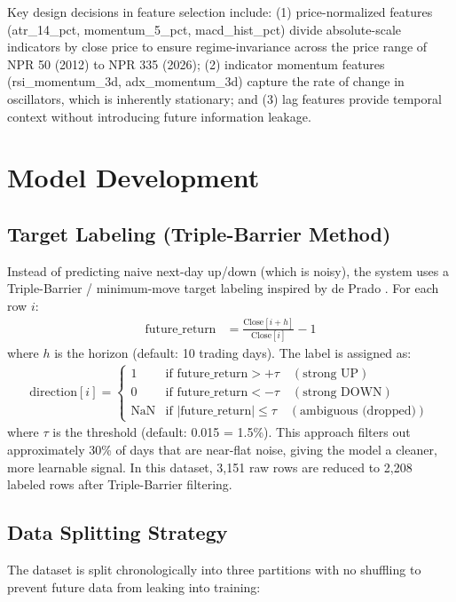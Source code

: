 \documentclass[12pt, a4paper]{report}
\begin{document}
	Key design decisions in feature selection include: (1) price-normalized features (atr\_14\_pct, momentum\_5\_pct, macd\_hist\_pct) divide absolute-scale indicators by close price to ensure regime-invariance across the price range of NPR 50 (2012) to NPR 335 (2026); (2) indicator momentum features (rsi\_momentum\_3d, adx\_momentum\_3d) capture the rate of change in oscillators, which is inherently stationary; and (3) lag features provide temporal context without introducing future information leakage.
	
	\section{Model Development}
	
	\subsection{Target Labeling (Triple-Barrier Method)}
	Instead of predicting naive next-day up/down (which is noisy), the system uses a Triple-Barrier / minimum-move target labeling inspired by de Prado \cite{deprado2018}. For each row $i$:
	\begin{align}
		\text{future\_return} &= \frac{\text{Close}[i + h]}{\text{Close}[i]} - 1
	\end{align}
	where $h$ is the horizon (default: 10 trading days). The label is assigned as:
	\begin{align}
		\text{direction}[i] = \begin{cases}
			1 & \text{if future\_return} > +\tau \quad (\text{strong UP}) \\
			0 & \text{if future\_return} < -\tau \quad (\text{strong DOWN}) \\
			\text{NaN} & \text{if } |\text{future\_return}| \leq \tau \quad (\text{ambiguous (dropped)})
		\end{cases}
	\end{align}
	where $\tau$ is the threshold (default: 0.015 = 1.5\%). This approach filters out approximately 30\% of days that are near-flat noise, giving the model a cleaner, more learnable signal. In this dataset, 3,151 raw rows are reduced to 2,208 labeled rows after Triple-Barrier filtering.
	
	\subsection{Data Splitting Strategy}
	The dataset is split chronologically into three partitions with no shuffling to prevent future data from leaking into training:
	
\end{document}
